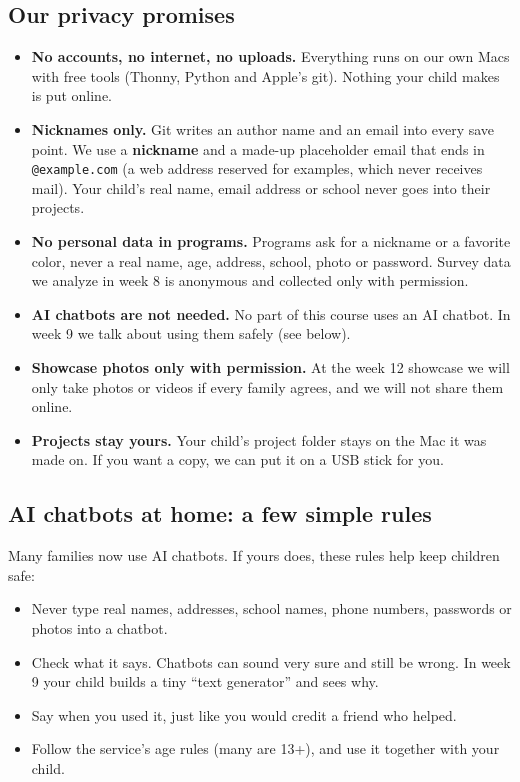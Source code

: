 \documentclass[level=3]{kidscode}
\begin{document}
\subsection{Our privacy promises}
\begin{safety}
\begin{itemize}[leftmargin=1.2em,itemsep=2pt]
  \item \textbf{No accounts, no internet, no uploads.} Everything runs on our own Macs with free
        tools (Thonny, Python and Apple's git). Nothing your child makes is put online.
  \item \textbf{Nicknames only.} Git writes an author name and an email into every save point. We
        use a \textbf{nickname} and a made-up placeholder email that ends in
        \texttt{@example.com} (a web address reserved for examples, which never receives mail).
        Your child's real name, email address or school never goes into their projects.
  \item \textbf{No personal data in programs.} Programs ask for a nickname or a favorite color,
        never a real name, age, address, school, photo or password. Survey data we analyze in
        week 8 is anonymous and collected only with permission.
  \item \textbf{AI chatbots are not needed.} No part of this course uses an AI chatbot. In week 9 we
        talk about using them safely (see below).
  \item \textbf{Showcase photos only with permission.} At the week 12 showcase we will only take
        photos or videos if every family agrees, and we will not share them online.
  \item \textbf{Projects stay yours.} Your child's project folder stays on the Mac it was made on.
        If you want a copy, we can put it on a USB stick for you.
\end{itemize}
\end{safety}

\subsection{AI chatbots at home: a few simple rules}
Many families now use AI chatbots. If yours does, these rules help keep children safe:
\begin{itemize}[itemsep=2pt]
  \item Never type real names, addresses, school names, phone numbers, passwords or photos into a
        chatbot.
  \item Check what it says. Chatbots can sound very sure and still be wrong. In week 9 your child
        builds a tiny \enquote{text generator} and sees why.
  \item Say when you used it, just like you would credit a friend who helped.
  \item Follow the service's age rules (many are 13+), and use it together with your child.
\end{itemize}
\end{document}
